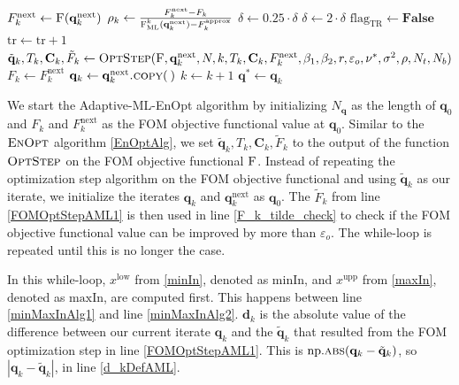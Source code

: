 \begin{algorithm}[H]
\begin{algorithmic}[1]
\State\label{AMLFOMEval2} $F^\mathrm{next}_k\gets \Call{F}{\mathbf{q}^\mathrm{next}_k}$
\State\label{rhoKDef} $\rho_k\gets \frac{F^\mathrm{next}_k-F_k}{\Call{F$_\mathrm{ML}^k$}{\mathbf{q}^\mathrm{next}_k}-F^\mathrm{approx}_k}$
\State $\delta\gets0.25\cdot\delta$
\Else
{}
\State $\delta\gets2\cdot\delta$
\EndIf
\EndIf
{}
\State $\mathrm{flag}_\mathrm{TR}\gets\mathbf{False}$
\EndIf
\EndWhile
\State $\mathrm{tr}\gets\mathrm{tr}+1$
\EndWhile
\State\label{FOMOptStepAML2} $\tilde{\mathbf{q}}_k,T_k,\mathbf{C}_k,\tilde{F}_k\gets\Call{OptStep}{\textproc{F},\mathbf{q}^\mathrm{next}_k,N,k,T_k,\mathbf{C}_k, F^\mathrm{next}_k, \beta_1, \beta_2, r, \varepsilon_o ,\nu^*, \sigma^2, \rho, N_t, N_b}$
\State $F_k \gets F^\mathrm{next}_k$
\State\label{AMLSetqk} $\mathbf{q}_k \gets \mathbf{q}^\mathrm{next}_k\Call{.copy}{\:}$
\State $k\gets k+1$
\EndWhile\label{AMLEnOptWhileEnd}
\State \Return $\mathbf{q}^*\gets\mathbf{q}_k$
\EndFunction
\end{algorithmic}
\end{algorithm}

We start the Adaptive-ML-EnOpt algorithm by initializing $N_\mathbf{q}$ as the length of ${\mathbf{q}_0}$ and $F_k$ and $F^\mathrm{next}_k$ as the FOM objective functional value at $\mathbf{q}_0$. Similar to the $\textproc{EnOpt}$ algorithm \ref{EnOptAlg}, we set $\tilde{\mathbf{q}}_k,T_k,\mathbf{C}_k,\tilde{F}_k$ to the output of the function $\textproc{OptStep}$ on the FOM objective functional $\textproc{F}$. Instead of repeating the optimization step algorithm on the FOM objective functional and using $\tilde{\mathbf{q}}_k$ as our iterate, we initialize the iterates $\mathbf{q}_k$ and $\mathbf{q}^\mathrm{next}_k$ as $\mathbf{q}_0$. The $\tilde{F}_k$ from line \ref{FOMOptStepAML1} is then used in line \ref{F_k_tilde_check} to check if the FOM objective functional value can be improved by more than $\varepsilon_o$. The while-loop is repeated until this is no longer the case.

In this while-loop, $x^\mathrm{low}$ from \eqref{minIn}, denoted as $\mathrm{minIn}$, and $x^\mathrm{upp}$ from \eqref{maxIn}, denoted as $\mathrm{maxIn}$, are computed first. This happens between line \ref{minMaxInAlg1} and line \ref{minMaxInAlg2}. $\mathbf{d}_k$ is the absolute value of the difference between our current iterate $\mathbf{q}_k$ and the $\tilde{\mathbf{q}}_k$ that resulted from the FOM optimization step in line \ref{FOMOptStepAML1}. This is $\mathrm{np.}\Call{abs}{\mathbf{q}_k-\tilde{\mathbf{q}}_k}$, so $|\mathbf{q}_k-\tilde{\mathbf{q}}_k|$, in line \ref{d_kDefAML}.

